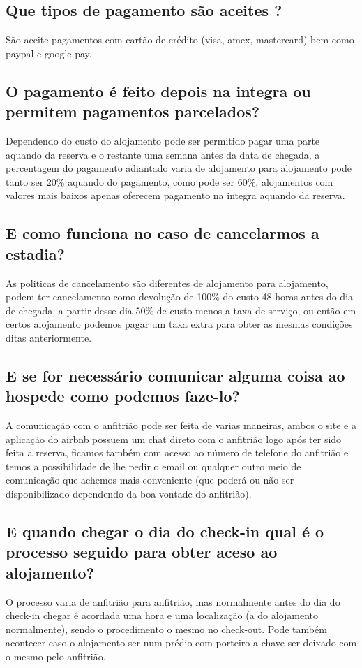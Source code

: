 \documentclass[a4paper]{article}
\begin{document}
\subsection{Que tipos de pagamento são aceites ?}
São aceite pagamentos com cartão de crédito (visa, amex, mastercard) bem como paypal e google pay.

\subsection{O pagamento é feito depois na integra ou permitem pagamentos parcelados?}
Dependendo do custo do alojamento pode ser permitido pagar uma parte aquando da reserva e o restante uma semana antes da data de chegada, a percentagem do pagamento adiantado varia de alojamento para alojamento pode tanto ser 20\% aquando do pagamento, como pode ser 60\%, alojamentos com valores mais baixos apenas oferecem pagamento na integra aquando da reserva.

\subsection{E como funciona no caso de cancelarmos a estadia?}
As politicas de cancelamento são diferentes de alojamento para alojamento, podem ter cancelamento como devolução de 100\% do custo 48 horas antes do dia de chegada, a partir desse dia 50\% de custo menos a taxa de serviço, ou então em certos alojamento podemos pagar um taxa extra para obter as mesmas condições ditas anteriormente.

\subsection{E se for necessário comunicar alguma coisa ao hospede como podemos faze-lo?}
A comunicação com o anfitrião pode ser feita de varias maneiras, ambos o site e a aplicação do airbnb possuem um chat direto com o anfitrião logo após ter sido feita a reserva, ficamos também com acesso ao número de telefone do anfitrião e temos a possibilidade de lhe pedir o email ou qualquer outro meio de comunicação que achemos mais conveniente (que poderá ou não ser disponibilizado dependendo da boa vontade do anfitrião).

\subsection{E quando chegar o dia do check-in qual é o processo seguido para obter aceso ao alojamento?}
O processo varia de anfitrião para anfitrião, mas normalmente antes do dia do check-in chegar é acordada uma hora e uma localização (a do alojamento normalmente), sendo o procedimento o mesmo no check-out.
Pode também acontecer caso o alojamento ser num prédio com porteiro a chave ser deixado com o mesmo pelo anfitrião.
\end{document}
